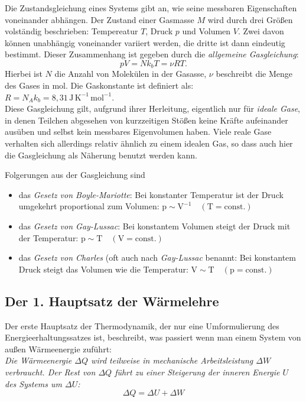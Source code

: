 Die Zustandsgleichung eines Systems gibt an, wie seine messbaren Eigenschaften voneinander abhängen. Der Zustand einer Gasmasse $M$ wird durch drei Größen volständig beschrieben: Tempereatur $T$, Druck $p$ und Volumen $V$. Zwei davon können unabhängig voneinander variiert werden, die dritte ist dann eindeutig bestimmt. Dieser Zusammenhang ist gegeben durch die \textit{allgemeine Gasgleichung}:
\begin{equation}
	pV = Nk_bT = \nu RT.
\end{equation}
Hierbei ist $N$ die Anzahl von Molekülen in der Gasasse, $\nu$ beschreibt die Menge des Gases in mol. Die Gaskonstante ist definiert als: $R = N_A k_b = 8,31\, \mathrm{J\, K^{-1}\, mol^{-1}}$.\\
Diese Gasgleichung gilt, aufgrund ihrer Herleitung, eigentlich nur für \textit{ideale Gase}, in denen Teilchen abgesehen von kurzzeitigen Stößen keine Kräfte aufeinander ausüben und selbst kein messbares Eigenvolumen haben. Viele reale Gase verhalten sich allerdings relativ ähnlich zu einem idealen Gas, so dass auch hier die Gasgleichung als Näherung benutzt werden kann.

Folgerungen aus der Gasgleichung sind
\begin{itemize}
	\item das \textit{Gesetz von Boyle-Mariotte}: Bei konstanter Temperatur ist der Druck umgekehrt proportional zum Volumen: $\mathrm{p\sim V^{-1} \quad (T=const.)}$
	\item das \textit{Gesetz von Gay-Lussac}: Bei konstantem Volumen steigt der Druck mit der Temperatur: $\mathrm{p\sim T \quad (V=const.)}$
	\item das \textit{Gesetz von Charles} (oft auch nach \textit{Gay-Lussac} benannt: Bei konstantem Druck steigt das Volumen wie die Temperatur: $\mathrm{V\sim T \quad (p=const.)}$
\end{itemize}

\subsection{Der 1. Hauptsatz der Wärmelehre}

Der erste Hauptsatz der Thermodynamik, der nur eine Umformulierung des Energieerhaltungssatzes ist, beschreibt, was passiert wenn man einem System von außen Wärmeenergie zuführt:\\
\textit{Die Wärmeenergie $\Delta Q$ wird teilweise in mechanische Arbeitsleistung $\Delta W$ verbraucht. Der Rest von $\Delta Q$ führt zu einer Steigerung der inneren Energie $U$ des Systems um $\Delta U$:}
	\begin{equation}
		\Delta Q = \Delta U + \Delta W
	\end{equation}

